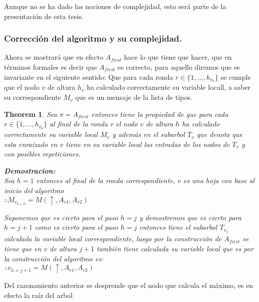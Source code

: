 \documentclass[10pt]{report}
\newtheorem{theorem}{Theorem}
\begin{document}
    Aunque no se ha dado las nociones de complejidad, esto será parte de la presentación de esta tesis.

    \subsubsection{Corrección del algoritmo y su complejidad.}


Ahora se mostrará que en efecto $A_{first}$ hace lo que tiene que hacer, que en términos
formales es decir que $A_{first}$ es correcto, para aquello diremos que es invariante en el siguiente sentido:\newline
Que para cada ronda $ r \in \lbrace 1,\dots, h_{r_{0}} \rbrace $ se cumple que el nodo $v$ de altura $h_{v}$ ha calculado correctamente
su variable locall, a saber su correspondiente $M_{v}$ que es un mensaje de la lista de tipos.
\\

\begin{theorem}
Sea $ \pi = A_{first}$ entonces tiene la propiedad de que para cada $r \in \lbrace 1, \ldots, h_{r_{0}}  \rbrace $
al final de la ronda r el nodo $v$ de altura $h$ ha calculado correctamente su variable local $M_{v}$ y
además en el subarbol $T_{v}$ que denota que esta enraizado en $v$ tiene en su variable local las entradas de los nodos de $T_{v}$
y con posibles repeticiones.

    \textbf{Demostracion:} \\
Sea $h=1$ entonces al final de la ronda correspondiente, $v$ es una hoja con
base al inicio del algoritmo\\
$\therefore M_{v_{h=0}}= M(\uparrow, A_{r1}, A_{r2})$

Suponemos que es cierto para el paso $h=j$  y demostremos que es cierto para $h = j+1$
como es cierto para el paso $h =j$ entonces tiene el subarbol $T_{v_{j}}$ calculada la variable
local correspondiente, luego por la construcción de $A_{first}$ se tiene que en $v$ de altura $j+1$
también tiene calculada su variable local que es por la construcción del algoritmo es:
\\
$\therefore {v_{h = j+1}} = M(\uparrow, A_{r1}, A_{r2})$
\end{theorem}
Del razonamiento anterior se desprende que el nodo que calcula el máximo, es en efecto la raíz del arbol
\end{document}
